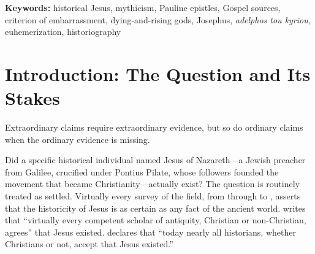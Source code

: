 \documentclass[12pt,oneside]{article}
\newcommand{\grk}[1]{\textit{#1}}   %
\begin{document}
\begin{abstract}
the speed of the Pauline-to-Markan transition remains a challenge
for the mythic-origin scenario that a rigorous version of it must
engage rather than dismiss.  (6)~The single passage most frequently
cited as decisive for historicity---Galatians~1:19, \enquote{James
the brother of the Lord}---is more ambiguous than the consensus
acknowledges when examined in its full Pauline context and against
the well-attested Greek religious-associative use of
\grk{adelphoi tou [patron]} as a community-title, as documented by
\citet{Harland2005}.  A corpus-linguistic baseline study of ~212
\textit{adelph-} tokens across six non-Christian contemporary-or-
earlier Greek corpora accompanies the paper as supplementary
material.  The evidence is insufficient to establish the historicity
of Jesus with the confidence the consensus claims, and the
mythic-origin model provides a parsimonious account of much of the
evidence.  The responsible conclusion is that the question is more
open than mainstream scholarship admits, that the mythicist
hypothesis---particularly in the form developed by
\citet{Carrier2014} which draws on Jewish rather than pagan
apocalyptic resources---deserves serious engagement rather than
dismissal, and that the scholarly consensus is sustained partly by
institutional and methodological inertia rather than by evidential
weight alone.
\end{abstract}

\vspace{0.5em}
\noindent\textbf{Keywords:} historical Jesus, mythicism, Pauline
epistles, Gospel sources, criterion of embarrassment, dying-and-rising
gods, Josephus, \grk{adelphos tou kyriou}, euhemerization,
historiography

\newpage
\tableofcontents
\newpage


\section{Introduction: The Question and Its Stakes}
\label{sec:intro}

\epigraph{Extraordinary claims require extraordinary evidence, but so do
ordinary claims when the ordinary evidence is missing.}{}

Did a specific historical individual named Jesus of Nazareth---a Jewish
preacher from Galilee, crucified under Pontius Pilate, whose followers
founded the movement that became Christianity---actually exist?  The
question is routinely treated as settled.  Virtually every survey of the
field, from \citet{Schweitzer1906} through \citet{Meier1991} to
\citet{Ehrman2012}, asserts that the historicity of Jesus is as certain
as any fact of the ancient world.  \citet{Ehrman2012} writes that
``virtually every competent scholar of antiquity, Christian or
non-Christian, agrees'' that Jesus existed.  \citet{Dunn2003} declares
that ``today nearly all historians, whether Christians or not, accept
that Jesus existed.''
\end{document}
